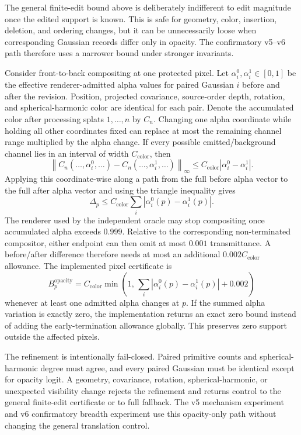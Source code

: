 The general finite-edit bound above is deliberately indifferent to edit
magnitude once the edited support is known. This is safe for geometry, color,
insertion, deletion, and ordering changes, but it can be unnecessarily loose
when corresponding Gaussian records differ only in opacity. The confirmatory
v5--v6 path therefore uses a narrower bound under stronger invariants.

Consider front-to-back compositing at one protected pixel. Let
$\alpha_i^0,\alpha_i^1\in[0,1]$ be the effective renderer-admitted alpha values
for paired Gaussian $i$ before and after the revision. Position, projected
covariance, source-order depth, rotation, and spherical-harmonic color are
identical for each pair. Denote the accumulated color after processing splats
$1,\ldots,n$ by $C_n$. Changing one alpha coordinate while holding all other
coordinates fixed can replace at most the remaining channel range multiplied
by the alpha change. If every possible emitted/background channel lies in an
interval of width $C_{\mathrm{color}}$, then
\[
  \left\lVert
  C_n(\ldots,\alpha_i^0,\ldots)
  -
  C_n(\ldots,\alpha_i^1,\ldots)
  \right\rVert_\infty
  \le
  C_{\mathrm{color}}
  \left|\alpha_i^0-\alpha_i^1\right|.
\]
Applying this coordinate-wise along a path from the full before alpha vector to
the full after alpha vector and using the triangle inequality gives
\[
  \Delta_p
  \le
  C_{\mathrm{color}}
  \sum_i
  \left|\alpha_i^0(p)-\alpha_i^1(p)\right|.
\]
The renderer used by the independent oracle may stop compositing once
accumulated alpha exceeds $0.999$. Relative to the corresponding non-terminated
compositor, either endpoint can then omit at most $0.001$ transmittance. A
before/after difference therefore needs at most an additional
$0.002C_{\mathrm{color}}$ allowance. The implemented pixel certificate is
\[
  B_p^{\mathrm{opacity}}
  =
  C_{\mathrm{color}}
  \min\!\left(
    1,\,
    \sum_i
    \left|\alpha_i^0(p)-\alpha_i^1(p)\right|
    +0.002
  \right)
\]
whenever at least one admitted alpha changes at $p$. If the summed alpha
variation is exactly zero, the implementation returns an exact zero bound
instead of adding the early-termination allowance globally. This preserves
zero support outside the affected pixels.

The refinement is intentionally fail-closed. Paired primitive counts and
spherical-harmonic degree must agree, and every paired Gaussian must be
identical except for opacity logit. A geometry, covariance, rotation,
spherical-harmonic, or unexpected visibility change rejects the refinement and
returns control to the general finite-edit certificate or to full fallback.
The v5 mechanism experiment and v6 confirmatory breadth experiment use this
opacity-only path without changing the general translation control.
